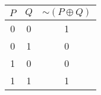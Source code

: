 \begin{tabular}{|c|c||c|}
\hline
$ P $ & $ Q $ & $  \sim (P \oplus Q) $ \\
\hline
0 & 0 & 1 \\
0 & 1 & 0 \\
1 & 0 & 0 \\
1 & 1 & 1 \\
\hline
\end{tabular}
\label{table:tt1}
